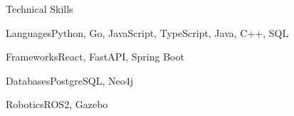 \documentclass[
	11pt
]{../../../template}
\begin{document}
	\begin{rSection}{T}{echnical Skills}
		\begin{rSet}{Languages}{Python, Go, JavaScript, TypeScript, Java, C++, SQL}
		\end{rSet}
		\begin{rSet}{Frameworks}{React, FastAPI, Spring Boot}
		\end{rSet}
		\begin{rSet}{Databases}{PostgreSQL, Neo4j}
		\end{rSet}
		\begin{rSet}{Robotics}{ROS2, Gazebo}
		\end{rSet}
	\end{rSection}
\end{document}
